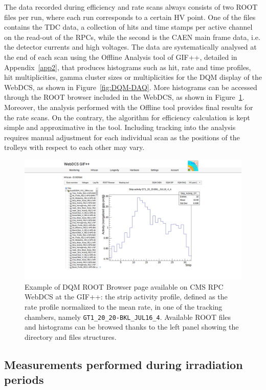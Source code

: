 	The data recorded during efficiency and rate scans always consists of two ROOT files per run, where each run corresponds to a certain HV point. One of the files contains the TDC data, a collection of hits and time stamps per active channel on the read-out of the RPCs, while the second is the CAEN main frame data, i.e. the detector currents and high voltages. The data are systematically analysed at the end of each scan using the Offline Analysis tool of GIF++, detailed in Appendix~\ref{app2}, that produces histograms such as hit, rate and time profiles, hit multiplicities, gamma cluster sizes or multiplicities for the DQM display of the WebDCS, as shown in Figure~\ref{fig:DQM-DAQ}. More histograms can be accessed through the ROOT browser included in the WebDCS, as shown in Figure~\ref{fig:DQM-ROOT}. Moreover, the analysis performed with the Offline tool provides final results for the rate scans. On the contrary, the algorithm for efficiency calculation is kept simple and approximative in the tool. Including tracking into the analysis requires manual adjustment for each individual scan as the positions of the trolleys with respect to each other may vary.

	\begin{figure}[H]
        \centering
		\includegraphics[width = \linewidth]{fig/chapt5/GIFpp-ROOT-browser.png}
		\caption{\label{fig:DQM-ROOT} Example of DQM ROOT Browser page available on CMS RPC WebDCS at the GIF++: the strip activity profile, defined as the rate profile normalized to the mean rate, in one of the tracking chambers, namely \texttt{GT1\_20\_20-BKL\_JUL16\_4}. Available ROOT files and histograms can be browsed thanks to the left panel showing the directory and files structures.}
	\end{figure}

	\subsection{Measurements performed during irradiation periods}
	\label{chapt5:ssec:irradiation}
	
